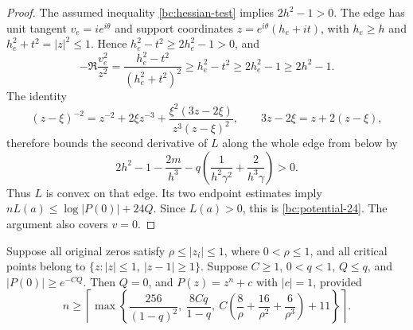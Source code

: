 \begin{proof}
The assumed inequality \eqref{bc:hessian-test} implies $2h^2-1>0$.
The edge has unit tangent $v_e=ie^{i\theta}$ and support coordinates
$z=e^{i\theta}(h_e+it)$, with $h_e\geq h$ and
$h_e^2+t^2=|z|^2\leq1$.  Hence $h_e^2-t^2\geq2h_e^2-1>0$, and
\[
 -\Re\frac{v_e^2}{z^2}
 =\frac{h_e^2-t^2}{(h_e^2+t^2)^2}
 \geq h_e^2-t^2\geq2h_e^2-1\geq2h^2-1.
\]
The identity
\[
 (z-\xi)^{-2}=z^{-2}+2\xi z^{-3}
       +\frac{\xi^2(3z-2\xi)}{z^3(z-\xi)^2},
 \qquad 3z-2\xi=z+2(z-\xi),
\]
therefore bounds the second derivative of $L$ along the whole edge
from below by
\begin{equation}\label{bc:hessian-test}
 2h^2-1-\frac{2m}{h^3}
       -q\left(\frac1{h^2\gamma^2}+\frac2{h^3\gamma}\right)>0.
\end{equation}
Thus $L$ is convex on that edge.  Its two endpoint estimates imply
$nL(a)\leq\log|P(0)|+24Q$.  Since $L(a)>0$, this is
\eqref{bc:potential-24}.  The argument also covers $v=0$.
\end{proof}

\begin{lemma}\label{bc:cubic-rigidity}
Suppose all original zeros satisfy $\rho\leq|z_i|\leq1$, where
$0<\rho\leq1$, and all critical points belong to
$\{z:|z|\leq1,\ |z-1|\geq1\}$.  Suppose $C\geq1$, $0<q<1$,
$Q\leq q$, and $|P(0)|\geq e^{-CQ}$.  Then $Q=0$, and
$P(z)=z^n+c$ with $|c|=1$, provided
\begin{equation}\label{bc:rigidity-floor}
 n\geq\left\lceil\max\left\{
 \frac{256}{(1-q)^2},\ \frac{8Cq}{1-q},\
 C\left(\frac8\rho+\frac{16}{\rho^2}+\frac6{\rho^3}\right)+11
 \right\}\right\rceil.
\end{equation}
\end{lemma}

